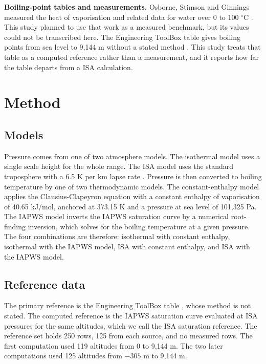\documentclass[11pt,letterpaper]{article}
\begin{document}
\textbf{Boiling-point tables and measurements.} Osborne, Stimson and Ginnings measured the heat of vaporisation and related data for water over 0 to 100 $^\circ$C \cite{Osborne1939}. This study planned to use that work as a measured benchmark, but its values could not be transcribed here. The Engineering ToolBox table gives boiling points from sea level to 9,144 m without a stated method \cite{EngineeringToolBox}. This study treats that table as a computed reference rather than a measurement, and it reports how far the table departs from a ISA calculation.

\section{Method}\label{sec:method}

\subsection{Models}

Pressure comes from one of two atmosphere models. The isothermal model uses a single scale height for the whole range. The ISA model uses the standard troposphere with a 6.5 K per km lapse rate \cite{ICAO1993}. Pressure is then converted to boiling temperature by one of two thermodynamic models. The constant-enthalpy model applies the Clausius-Clapeyron equation with a constant enthalpy of vaporisation of 40.65 kJ/mol, anchored at 373.15 K and a pressure at sea level of 101,325 Pa. The IAPWS model inverts the IAPWS saturation curve \cite{IAPWS1997} by a numerical root-finding inversion, which solves for the boiling temperature at a given pressure. The four combinations are therefore: isothermal with constant enthalpy, isothermal with the IAPWS model, ISA with constant enthalpy, and ISA with the IAPWS model.

\subsection{Reference data}\label{sec:refdata}

The primary reference is the Engineering ToolBox table \cite{EngineeringToolBox}, whose method is not stated. The computed reference is the IAPWS saturation curve evaluated at ISA pressures for the same altitudes, which we call the ISA saturation reference. The reference set holds 250 rows, 125 from each source, and no measured rows. The first computation used 119 altitudes from 0 to 9,144 m. The two later computations used 125 altitudes from $-305$ m to 9,144 m.
\end{document}
